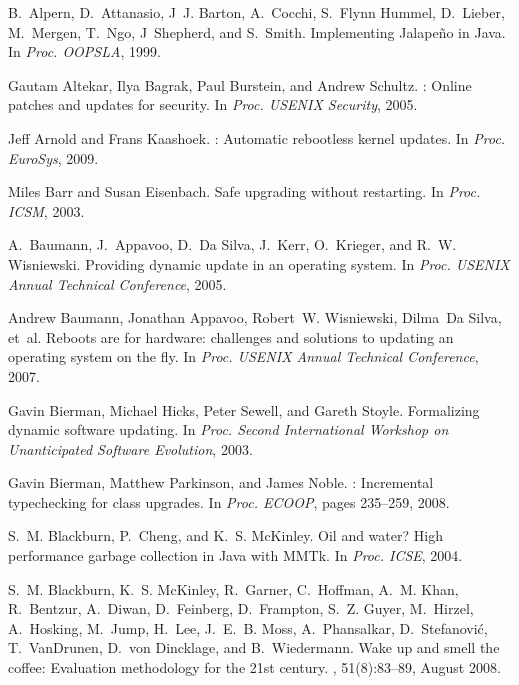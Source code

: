\documentclass[9pt]{sigplanconf}
\begin{document}
% 
% 
\begin{thebibliography}{10}

B.~Alpern, D.~Attanasio, J~J. Barton, A.~Cocchi, S.~Flynn Hummel, D.~Lieber,
  M.~Mergen, T.~Ngo, J~Shepherd, and S.~Smith.
\newblock Implementing {J}alape\~{n}o in {J}ava.
\newblock In {\em Proc. OOPSLA}, 1999.

Gautam Altekar, Ilya Bagrak, Paul Burstein, and Andrew Schultz.
: Online patches and updates for security.
\newblock In {\em Proc. USENIX Security}, 2005.

Jeff Arnold and Frans Kaashoek.
: Automatic rebootless kernel updates.
\newblock In {\em Proc. EuroSys}, 2009.

Miles Barr and Susan Eisenbach.
\newblock Safe upgrading without restarting.
\newblock In {\em Proc. ICSM}, 2003.

A.~Baumann, J.~Appavoo, D.~Da Silva, J.~Kerr, O.~Krieger, and R.~W. Wisniewski.
\newblock Providing dynamic update in an operating system.
\newblock In {\em Proc. USENIX Annual Technical Conference}, 2005.

Andrew Baumann, Jonathan Appavoo, Robert~W. Wisniewski, Dilma~Da Silva, et~al.
\newblock Reboots are for hardware: challenges and solutions to updating an
  operating system on the fly.
\newblock In {\em Proc. USENIX Annual Technical Conference}, 2007.

Gavin Bierman, Michael Hicks, Peter Sewell, and Gareth Stoyle.
\newblock Formalizing dynamic software updating.
\newblock In {\em Proc. Second International Workshop on Unanticipated Software
  Evolution}, 2003.

Gavin Bierman, Matthew Parkinson, and James Noble.
: Incremental typechecking for class upgrades.
\newblock In {\em Proc. ECOOP}, pages 235--259, 2008.

S.~M. Blackburn, P.~Cheng, and K.~S. McKinley.
\newblock Oil and water? {High} performance garbage collection in {Java} with
  {MMTk}.
\newblock In {\em Proc. ICSE}, 2004.

S.~M. Blackburn, K.~S. McKinley, R.~Garner, C.~Hoffman, A.~M. Khan, R.~Bentzur,
  A.~Diwan, D.~Feinberg, D.~Frampton, S.~Z. Guyer, M.~Hirzel, A.~Hosking,
  M.~Jump, H.~Lee, J.~E.~B. Moss, A.~Phansalkar, D.~Stefanovi\'{c},
  T.~{VanDrunen}, D.~von Dincklage, and B.~Wiedermann.
\newblock Wake up and smell the coffee: {Evaluation} methodology for the 21st
  century.
, 51(8):83--89, August 2008.


\end{thebibliography}
\end{document}
